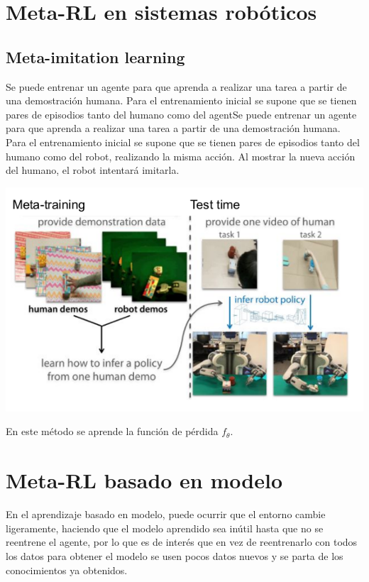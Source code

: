 \section{Meta-RL en sistemas robóticos}%
\label{sec:meta_rl_en_sistemas_robóticos}

\subsection{Meta-imitation learning}%
\label{sub:meta_imitation_learning}

Se puede entrenar un agente para que aprenda a realizar una tarea a partir de una demostración
humana. Para el entrenamiento inicial se supone que se tienen pares de episodios tanto del
humano como del agentSe puede entrenar un agente para que aprenda a realizar una tarea a partir
de una demostración humana. Para el entrenamiento inicial se supone que se tienen pares de
episodios tanto del humano como del robot, realizando la misma acción. Al mostrar la nueva
acción del humano, el robot intentará imitarla.

\begin{center}
\includegraphics[width=.6\textwidth]{figures/2020-07-25-184423_582x365_scrot.png}
\end{center}

En este método se aprende la función de pérdida $f_\theta$.

\section{Meta-RL basado en modelo}%
\label{sec:meta_rl_basado_en_modelo}

En el aprendizaje basado en modelo, puede ocurrir que el entorno cambie ligeramente,
haciendo que el modelo aprendido sea inútil hasta que no se reentrene el agente, por lo que
es de interés que en vez de reentrenarlo con todos los datos para obtener el modelo se usen pocos
datos nuevos y se parta de los conocimientos ya obtenidos.

